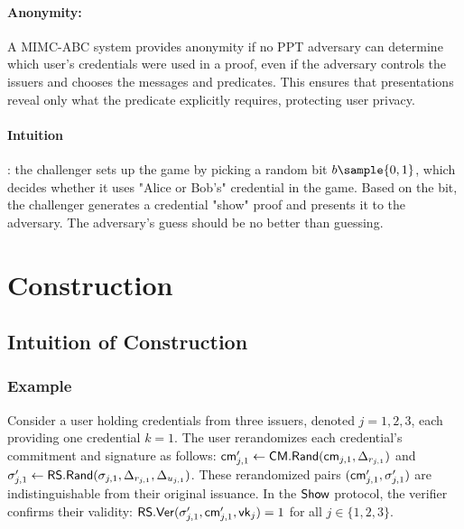 \paragraph{Anonymity: }A MIMC-ABC system provides anonymity if no PPT adversary can determine which user’s credentials were used in a proof, even if the adversary controls the issuers and chooses the messages and predicates. This ensures that presentations reveal only what the predicate explicitly requires, protecting user privacy.

\paragraph{Intuition}: the challenger sets up the game by picking a random bit $b \sample \bit$, which decides whether it uses "Alice or Bob's" credential in the game. Based on the bit, the challenger generates a credential "show" proof and presents it to the adversary. The adversary's guess should be no better than guessing.


























\newpage
\section{Construction}

\subsection{Intuition of Construction}

\subsubsection{Example}
Consider a user holding credentials from three issuers, denoted $j = 1, 2, 3$, each providing one credential $k = 1$. The user rerandomizes each credential’s commitment and signature as follows: $\mathsf{cm}_{j,1}' \gets \mathsf{CM.Rand}(\mathsf{cm}_{j,1}, \Delta_{r_{j,1}})$ and $\sigma_{j,1}' \gets \mathsf{RS.Rand}(\sigma_{j,1}, \Delta_{r_{j,1}}, \Delta_{u_{j,1}})$. These rerandomized pairs $(\mathsf{cm}_{j,1}', \sigma_{j,1}')$ are indistinguishable from their original issuance. In the $\mathsf{Show}$ protocol, the verifier confirms their validity: $\mathsf{RS.Ver}(\sigma_{j,1}', \mathsf{cm}_{j,1}', \mathsf{vk}_j) = 1$ for all $j \in \{1, 2, 3\}$.


